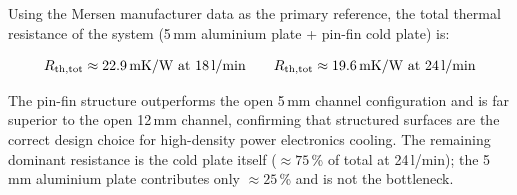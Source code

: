 \documentclass[a4paper,11pt]{article}
\begin{document}
Using the Mersen manufacturer data as the primary reference, the total thermal
resistance of the system (5\,mm aluminium plate + pin-fin cold plate) is:

\begin{equation}
  R_{\mathrm{th,tot}} \approx \SI{22.9}{mK/W} \text{ at \SI{18}{l/min}}
  \qquad
  R_{\mathrm{th,tot}} \approx \SI{19.6}{mK/W} \text{ at \SI{24}{l/min}}
\end{equation}

The pin-fin structure outperforms the open 5\,mm channel configuration and is far
superior to the open 12\,mm channel, confirming that structured surfaces are the
correct design choice for high-density power electronics cooling. The remaining
dominant resistance is the cold plate itself ($\approx 75$\,\% of total at
24\,l/min); the 5\,mm aluminium plate contributes only $\approx 25$\,\% and is
not the bottleneck.
\end{document}
